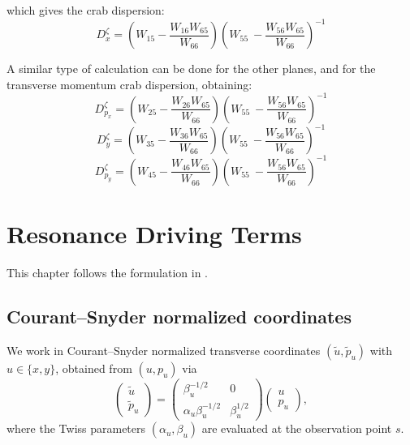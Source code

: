 which gives the crab dispersion:
\begin{equation}
D_x^\zeta = \left(W_{15} -\frac{W_{16}W_{65}}{W_{66}}\right)\left( W_{55}\ -  \frac{W_{56}W_{65}}{W_{66}} \right)^{-1}
\end{equation}

A similar type of calculation can be done for the other planes, and for the transverse momentum crab dispersion, obtaining:
\begin{equation}
D_{p_x}^\zeta = \left(W_{25} -\frac{W_{26}W_{65}}{W_{66}}\right)\left( W_{55}\ -  \frac{W_{56}W_{65}}{W_{66}} \right)^{-1}
\end{equation}
\begin{equation}
D_{y}^\zeta = \left(W_{35} -\frac{W_{36}W_{65}}{W_{66}}\right)\left( W_{55}\ -  \frac{W_{56}W_{65}}{W_{66}} \right)^{-1}
\end{equation}
\begin{equation}
D_{p_y}^\zeta = \left(W_{45} -\frac{W_{46}W_{65}}{W_{66}}\right)\left( W_{55}\ -  \frac{W_{56}W_{65}}{W_{66}} \right)^{-1}
\end{equation}

\chapter{Resonance Driving Terms}
\label{ch:rdt}

This chapter follows the formulation in \cite{PhysRevSTAB.17.074001,franchi2023analyticformulasrapidevaluation}.

\section{Courant--Snyder normalized coordinates}

We work in Courant--Snyder normalized transverse coordinates $(\tilde u,\tilde p_u)$ with $u \in \{x,y\}$, obtained from $(u,p_u)$ via
\begin{equation}
\begin{pmatrix}
\tilde u\\
\tilde p_u
\end{pmatrix}
=
\begin{pmatrix}
\beta_u^{-1/2} & 0\\
\alpha_u \beta_u^{-1/2} & \beta_u^{1/2}
\end{pmatrix}
\begin{pmatrix}
u\\
p_u
\end{pmatrix},
\end{equation}
where the Twiss parameters $(\alpha_u,\beta_u)$ are evaluated at the observation point $s$.

